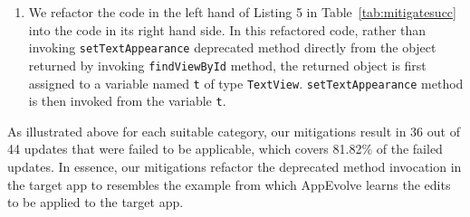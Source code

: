 \begin{enumerate}
\item We refactor the code in the left hand of Listing 5 in  Table~\ref{tab:mitigatesucc} into the code in its right hand side. In this refactored code, rather than invoking {\tt setTextAppearance} deprecated method directly from the object returned by invoking {\tt findViewById} method, the returned object is first assigned to a variable named {\tt t} of type {\tt TextView}. {\tt setTextAppearance} method is then invoked from the variable {\tt t}.

\end{enumerate}

As illustrated above for each suitable category, our mitigations result in 36 out of 44 updates that were failed to be applicable, which covers 81.82\% of the failed updates. In essence, our mitigations refactor the deprecated method invocation in the target app to resembles the example from which AppEvolve learns the edits to be applied to the target app. 
